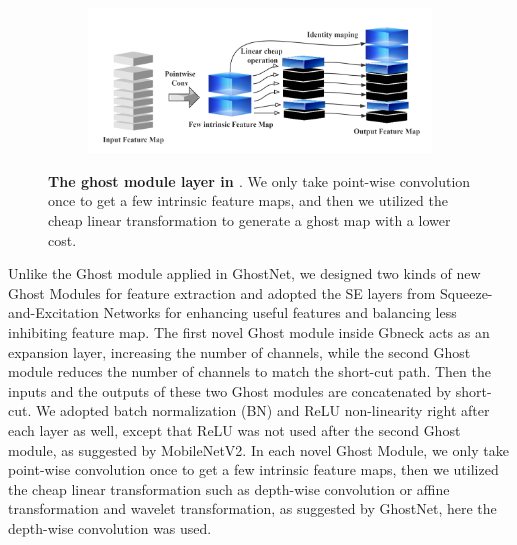 \begin{figure}[h]
	\begin{center}
		
		\begin{subfigure}[b]{\textwidth}
		    \centering
			\includegraphics[width=\textwidth]{thesis-template-master/images/ghostmodule.png}
			
			\label{fig:cellnet}
		\end{subfigure}
	\end{center}
	\caption{\textbf{The ghost module layer in \cite{19}}. We only take point-wise convolution once to get a few intrinsic feature maps, and then we utilized the cheap linear transformation to generate a ghost map with a lower cost.}
	\label{fig:3.8}
\end{figure}

Unlike the Ghost module applied in GhostNet\cite{19}, we designed two kinds of new Ghost Modules for feature extraction and adopted the SE layers from Squeeze-and-Excitation Networks \cite{24} for enhancing useful features and balancing less inhibiting feature map. The first novel Ghost module inside Gbneck acts as an expansion layer, increasing the number of channels, while the second Ghost module reduces the number of channels to match the short-cut path. Then the inputs and the outputs of these two Ghost modules are concatenated by short-cut. We adopted batch normalization (BN) and ReLU non-linearity right after each layer as well\cite{19}, except that ReLU was not used after the second Ghost module, as suggested by MobileNetV2\cite{30}. In each novel Ghost Module, we only take point-wise convolution once to get a few intrinsic feature maps, then we utilized the cheap linear transformation such as depth-wise convolution or affine transformation and wavelet transformation, as suggested by GhostNet\cite{19}, here the depth-wise convolution was used.

